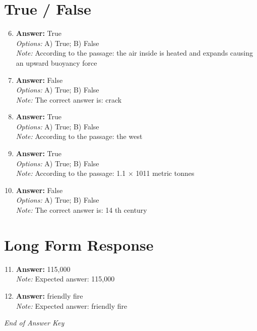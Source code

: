 \documentclass[12pt]{article}
\begin{document}
\section*{True / False}
\begin{enumerate}[label=\arabic*.]
\setcounter{enumi}{5}
\item \textbf{Answer:} True
\\ \textit{Options:} A) True; B) False
\\ \textit{Note:} According to the passage: the air inside is heated and expands causing an upward buoyancy force
\item \textbf{Answer:} False
\\ \textit{Options:} A) True; B) False
\\ \textit{Note:} The correct answer is: crack
\item \textbf{Answer:} True
\\ \textit{Options:} A) True; B) False
\\ \textit{Note:} According to the passage: the west
\item \textbf{Answer:} True
\\ \textit{Options:} A) True; B) False
\\ \textit{Note:} According to the passage: 1.1 \ensuremath{\times} 1011 metric tonnes
\item \textbf{Answer:} False
\\ \textit{Options:} A) True; B) False
\\ \textit{Note:} The correct answer is: 14 th century
\end{enumerate}

\section*{Long Form Response}
\begin{enumerate}[label=\arabic*.]
\setcounter{enumi}{10}
\item \textbf{Answer:} 115,000
\\ \textit{Note:} Expected answer: 115,000
\item \textbf{Answer:} friendly fire
\\ \textit{Note:} Expected answer: friendly fire
\end{enumerate}

\vfill
\noindent\textit{End of Answer Key}
\end{document}
